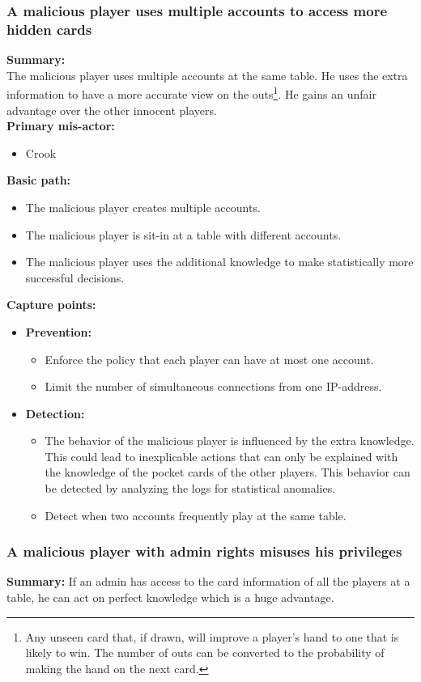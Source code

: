\documentclass[a4paper,11pt]{report}
\begin{document}
\subsubsection{A malicious player uses multiple accounts to access more hidden cards}
\textbf{Summary:} \\
The malicious player uses multiple accounts at the same table. He uses the extra information to  have a more accurate view on the outs\footnote{Any unseen card that, if drawn, will improve a player's hand to one that is likely to win. The number of outs can be converted to the probability of making the hand on the next card.}. He gains an unfair advantage over the other innocent players. \\
\textbf{Primary mis-actor:}
\begin{itemize}
\item Crook
\end{itemize}
\textbf{Basic path:}
\begin{itemize}
\item The malicious player creates multiple accounts.
\item The malicious player is sit-in at a table with different accounts.
\item The malicious player uses the additional knowledge to make statistically more successful decisions.
\end{itemize}
\textbf{Capture points:}
\begin{itemize}
\item \textbf{Prevention:}
\begin{itemize}
\item Enforce the policy that each player can have at most one account.
\item Limit the number of simultaneous connections from one IP-address.
\end{itemize}
\item \textbf{Detection:}
\begin{itemize}
\item The behavior of the malicious player is influenced by the extra knowledge. This could lead to inexplicable actions that can only be explained with the knowledge of the pocket cards of the other players. This behavior can be detected by analyzing the logs for statistical anomalies.
\item Detect when two accounts frequently play at the same table.
\end{itemize}
\end{itemize}
\subsubsection{A malicious player with admin rights misuses his privileges}
\textbf{Summary:} If an admin has access to the card information of all the players at a table, he can act on perfect knowledge which is a huge advantage.
\end{document}
